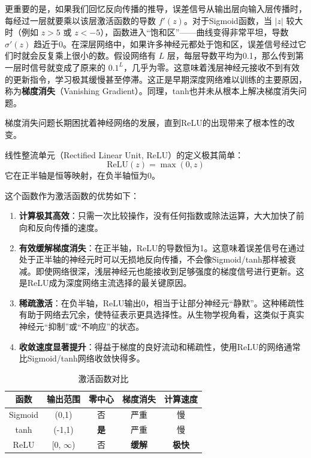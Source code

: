 \documentclass[lang=cn,zihao=-4,a4paper,fontset=windows]{beautybook}
\begin{document}
更重要的是，如果我们回忆反向传播的推导，误差信号从输出层向输入层传播时，每经过一层就要乘以该层激活函数的导数 $f'(z)$。对于Sigmoid函数，当 $|z|$ 较大时（例如 $z>5$ 或 $z<-5$），函数进入“饱和区”——曲线变得非常平坦，导数 $\sigma'(z)$ 趋近于0。在深层网络中，如果许多神经元都处于饱和区，误差信号经过它们时就会反复乘上很小的数。假设网络有 $L$ 层，每层导数平均为0.1，那么传到第一层时信号就变成了原来的 $0.1^L$，几乎为零。这意味着浅层神经元接收不到有效的更新指令，学习极其缓慢甚至停滞。这正是早期深度网络难以训练的主要原因，称为\textbf{梯度消失}（Vanishing Gradient）。同理，tanh也并未从根本上解决梯度消失问题。

梯度消失问题长期困扰着神经网络的发展，直到ReLU的出现带来了根本性的改变。

\begin{definition}[][线性整流单元ReLU]
线性整流单元（Rectified Linear Unit, ReLU）的定义极其简单：
\[
\text{ReLU}(z) = \max(0, z)
\]
它在正半轴是恒等映射，在负半轴恒为0。
\end{definition}
这个函数作为激活函数的优势如下：
\begin{enumerate}
    \item \textbf{计算极其高效}：只需一次比较操作，没有任何指数或除法运算，大大加快了前向和反向传播的速度。
    \item \textbf{有效缓解梯度消失}：在正半轴，ReLU的导数恒为1。这意味着误差信号在通过处于正半轴的神经元时可以无损地反向传播，不会像Sigmoid/tanh那样被衰减。即使网络很深，浅层神经元也能接收到足够强度的梯度信号进行更新。这是ReLU成为深度网络主流选择的最关键原因。
    \item \textbf{稀疏激活}：在负半轴，ReLU输出0，相当于让部分神经元“静默”。这种稀疏性有助于网络去冗余，使特征表示更具选择性。从生物学视角看，这类似于真实神经元“抑制”或“不响应”的状态。
    \item \textbf{收敛速度显著提升}：得益于梯度的良好流动和稀疏性，使用ReLU的网络通常比Sigmoid/tanh网络收敛快得多。
\end{enumerate}
\begin{table}[h]
\centering
\caption{激活函数对比}
\begin{tabular}{ccccc}
\toprule
\textbf{函数} & \textbf{输出范围} & \textbf{零中心} & \textbf{梯度消失} & \textbf{计算速度} \\
\midrule
Sigmoid & (0,1) & 否 & 严重 & 慢 \\
tanh & (-1,1) & \textbf{是} & 严重 & 慢 \\
ReLU & [0, $\infty$) & 否 & \textbf{缓解} & \textbf{极快} \\
\bottomrule
\end{tabular}
\end{table}
\end{document}
